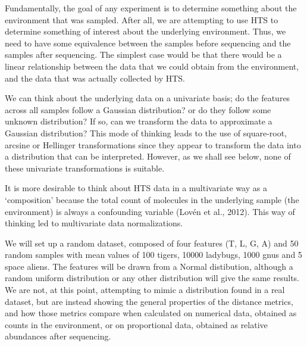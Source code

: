 \documentclass[twocolumn]{article}
\begin{document}
Fundamentally, the goal of any experiment is to determine something
about the environment that was sampled. After all, we are attempting to
use HTS to determine something of interest about the underlying
environment. Thus, we need to have some equivalence between the samples
before sequencing and the samples after sequencing. The simplest case
would be that there would be a linear relationship between the data that
we could obtain from the environment, and the data that was actually
collected by HTS.

We can think about the underlying data on a univariate basis; do the
features across all samples follow a Gaussian distribution? or do they
follow some unknown distribution? If so, can we transform the data to
approximate a Gaussian distribution? This mode of thinking leads to the
use of square-root, arcsine or Hellinger transformations since they
appear to transform the data into a distribution that can be
interpreted. However, as we shall see below, none of these univariate
transformations is suitable.

It is more desirable to think about HTS data in a multivariate way as a
`composition' because the total count of molecules in the underlying
sample (the environment) is always a confounding variable (Lovén et al.,
2012). This way of thinking led to multivariate data normalizations.

We will set up a random dataset, composed of four features (T, L, G, A)
and 50 random samples with mean values of 100 tigers, 10000 ladybugs,
1000 gnus and 5 space aliens. The features will be drawn from a Normal
distibution, although a random uniform distribution or any other
distribution will give the same results. We are not, at this point,
attempting to mimic a distribution found in a real dataset, but are
instead showing the general properties of the distance metrics, and how
those metrics compare when calculated on numerical data, obtained as
counts in the environment, or on proportional data, obtained as relative
abundances after sequencing.
\end{document}
